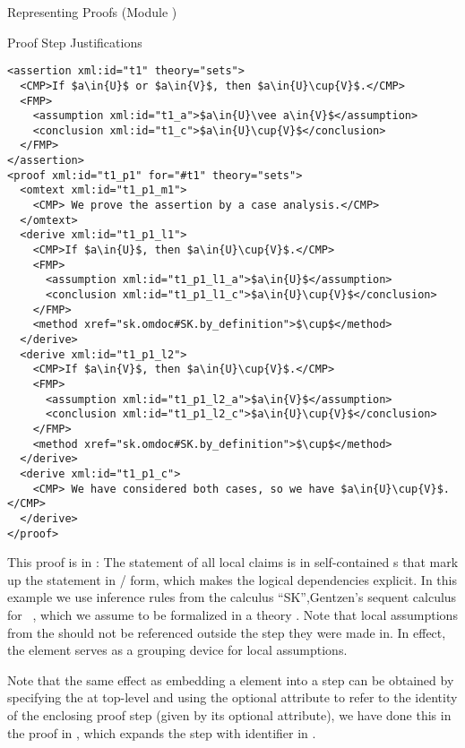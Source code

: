 \begin{tchapter}[id=proofs,short=Representing Proofs]{Representing Proofs (Module {})}
\begin{tsection}[id=proofs:justifications]{Proof Step Justifications}
\begin{lstlisting}[label=lst:expansion,mathescape,
  caption={An {\omdoc} Representation of a Proof by Cases},
  index={proof,derive,method,assumption,conclusion}]
<assertion xml:id="t1" theory="sets">
  <CMP>If $a\in{U}$ or $a\in{V}$, then $a\in{U}\cup{V}$.</CMP>
  <FMP>
    <assumption xml:id="t1_a">$a\in{U}\vee a\in{V}$</assumption>
    <conclusion xml:id="t1_c">$a\in{U}\cup{V}$</conclusion>
  </FMP>
</assertion>
<proof xml:id="t1_p1" for="#t1" theory="sets">
  <omtext xml:id="t1_p1_m1">
    <CMP> We prove the assertion by a case analysis.</CMP>
  </omtext>
  <derive xml:id="t1_p1_l1">
    <CMP>If $a\in{U}$, then $a\in{U}\cup{V}$.</CMP>
    <FMP>
      <assumption xml:id="t1_p1_l1_a">$a\in{U}$</assumption>
      <conclusion xml:id="t1_p1_l1_c">$a\in{U}\cup{V}$</conclusion>
    </FMP>
    <method xref="sk.omdoc#SK.by_definition">$\cup$</method>
  </derive> 
  <derive xml:id="t1_p1_l2">
    <CMP>If $a\in{V}$, then $a\in{U}\cup{V}$.</CMP>
    <FMP>
      <assumption xml:id="t1_p1_l2_a">$a\in{V}$</assumption>
      <conclusion xml:id="t1_p1_l2_c">$a\in{U}\cup{V}$</conclusion>
    </FMP>
    <method xref="sk.omdoc#SK.by_definition">$\cup$</method>
  </derive> 
  <derive xml:id="t1_p1_c">
    <CMP> We have considered both cases, so we have $a\in{U}\cup{V}$.</CMP>
  </derive> 
</proof>
\end{lstlisting}
This proof is in {{}}: The statement of all
local claims is in self-contained {s} that mark up the statement in
{}/{} form, which makes the logical dependencies
explicit. In this example we use inference rules from the calculus ``SK'',Gentzen's
sequent calculus for {}~\cite{Gentzen:uudlsiii35},
which we assume to be formalized in a theory {}.  Note that local assumptions
from the {} should not be referenced outside the {} step they
were made in. In effect, the {} element serves as a grouping device for
local assumptions.

Note that the same effect as embedding a {} element into a
{} step can be obtained by specifying the {} at top-level
and using the optional {} attribute to refer to the identity of the
enclosing proof step (given by its optional {}
attribute), we have done this in the proof in {}, which expands the
{} step with identifier {} in {}.


\end{tsection}
\end{tchapter}
